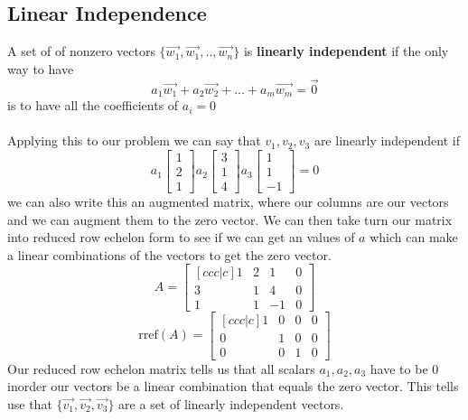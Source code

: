 \documentclass[12pt]{article}
\begin{document}
\subsection{Linear Independence}
A set of of nonzero vectors $\{\vec{w_1}, \vec{w_1},..,\vec{w_n}\}$ is \textbf{linearly independent} if the only way to have
\begin{equation*}a_1\vec{w_1}+a_2\vec{w_2}+...+a_m\vec{w_m} = \vec{0}\end{equation*}
is to have all the coefficients of $a_i=0$
\\\\ Applying this to our problem we can say that $v_1, v_2, v_3$ are linearly independent if
\begin{equation*}
a_1 \begin{bmatrix} 1 \\ 2 \\ 1\end{bmatrix}
a_2  \begin{bmatrix} 3 \\ 1 \\ 4\end{bmatrix}
a_3 \begin{bmatrix} 1 \\ 1 \\ -1\end{bmatrix} = 0
\end{equation*}
we can also write this an augmented matrix, where our columns are our vectors and we can augment them to the zero vector. We can then take turn our matrix into reduced row echelon form to see if we can get an values of  $a$ which can make a linear combinations of the vectors to get the zero vector.
\begin{equation*}
A = 
 \begin{bmatrix}[ccc|c] 
 1 & 2 & 1 & 0 \\
 3 & 1 & 4 & 0 \\
1 & 1 & -1 & 0 
\end{bmatrix}
\end{equation*}
\begin{equation*}
\text{rref}(A) = 
 \begin{bmatrix}[ccc|c] 
 1 & 0 & 0 & 0 \\
 0 & 1 & 0 & 0 \\
0 & 0 &  1 & 0 
\end{bmatrix}
\end{equation*}
Our reduced row echelon matrix tells us that all scalars $a_1, a_2, a_3$ have to be 0 inorder our vectors be a linear combination that equals the zero vector. This tells use that $\{\vec{v_1}, \vec{v_2}, \vec{v_3}\}$ are a set of linearly independent vectors.
\end{document}

